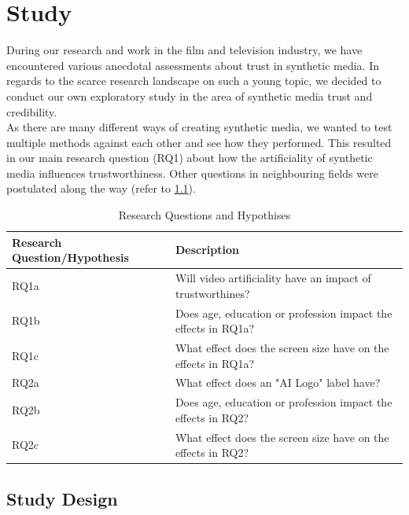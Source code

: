 \documentclass[
  a4paper,  %
  twoside,  %
  bibliography=totoc,
  headsepline,
  cleardoublepage=empty,
  parskip=half,
  draft=false
]{scrbook}
\begin{document}
\chapter{Study}
\label{chap:study}

During our research and work in the film and television industry, we have encountered various anecdotal assessments about trust in synthetic media. In regards to the scarce research landscape on such a young topic, we decided to conduct our own exploratory study in the area of synthetic media trust and credibility. \\
As there are many different ways of creating synthetic media, we wanted to test multiple methods against each other and see how they performed. This resulted in our main research question (RQ1) about how the artificiality of synthetic media influences trustworthiness. Other questions in neighbouring fields were postulated along the way (refer to \ref{tab:research-questions}).

\begin{table}[h]
  \centering
  \begin{tabularx}{\textwidth}{l|X}
    \textbf{Research Question/Hypothesis} & \textbf{Description}\\
    \midrule
    RQ1a & Will video artificiality have an impact of trustworthines?  \\
    \midrule
    RQ1b & Does age, education or profession impact the effects in RQ1a?  \\
    \midrule
    RQ1c & What effect does the screen size have on the effects in RQ1a?  \\
    \midrule
    RQ2a & What effect does an "AI Logo" label have?\\
    \midrule
    RQ2b & Does age, education or profession impact the effects in RQ2?  \\
    \midrule
    RQ2c & What effect does the screen size have on the effects in RQ2?  \\
  \end{tabularx}
  \caption{Research Questions and Hypothises}
  \label{tab:research-questions}
\end{table}

\section{Study Design}
\label{sec:study design}
\end{document}
